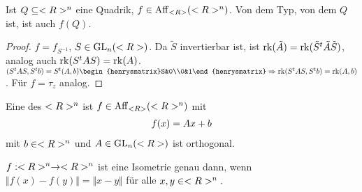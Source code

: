 \begin{lemma}
	Ist $Q\subseteq<R>^n$ eine Quadrik, $f\in\operatorname{Aff}_{<R>}(<R>^n)$. Von dem Typ, von dem $Q$ ist, ist auch $f(Q)$.
\end{lemma}
\begin{proof}
	$f=f_{S^{-1}}$, $S\in\operatorname{GL}_n(<R>)$. Da $\tilde{S}$ invertierbar ist, ist $\operatorname{rk}(\tilde{A})= \operatorname{rk}(\tilde{S}^t\tilde{A}\tilde{S})$, analog auch $\operatorname{rk}(S^tAS)=\operatorname{rk}(A)$. \\
	$(S^tAS,S^tb)=S^t(A,b)\begin{henrysmatrix}S&0\\0&1\end{henrysmatrix}\Rightarrow \rk(S^tAS,S^tb)=\rk(A,b)$. Für $f=\tau_z$ analog.
\end{proof}

\begin{definition}[Isometrie]
	Eine  des $<R>^n$ ist $f\in\operatorname{Aff}_{<R>}(<R>^n)$ mit
	\begin{align}
		f(x)=Ax+b\notag
	\end{align}
	mit $b\in<R>^n$ und $A\in\operatorname{GL}_n(<R>)$ ist orthogonal.
\end{definition}

\begin{remark}
	$f:<R>^n\to<R>^n$ ist eine Isometrie genau dann, wenn $\Vert f(x)-f(y)\Vert=\Vert x-y\Vert$ für alle $x,y\in<R>^n.$
\end{remark}

